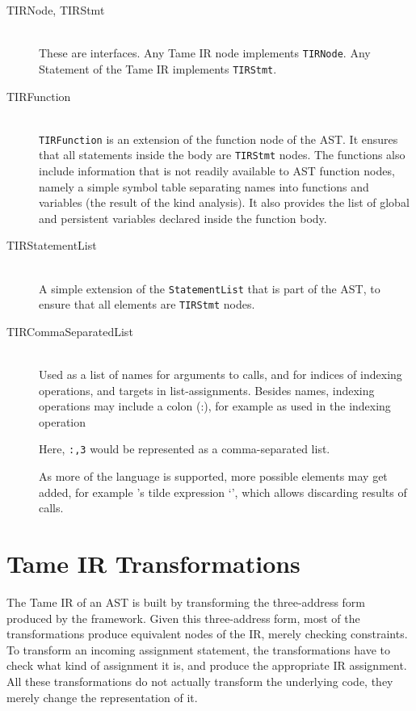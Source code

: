 \begin{description}
\item[TIRNode, TIRStmt] \hfill \\
These are interfaces. Any Tame IR node implements {\tt TIRNode}.
Any Statement of the Tame IR implements {\tt TIRStmt}.

\item[TIRFunction] \hfill \\
{\tt TIRFunction} is an extension of the function node of the AST.  It
ensures that all statements inside the body are {\tt TIRStmt} nodes.
The functions also include information that is not readily available to AST
function nodes, namely a simple symbol table separating names into
functions and variables (the result of the kind analysis).  It also
provides the list of global and persistent variables declared inside
the function body.

\item[TIRStatementList] \hfill \\
A simple extension of the {\tt StatementList} that is part of the AST,
to ensure that all elements are {\tt TIRStmt} nodes.

\item[TIRCommaSeparatedList] \hfill \\
Used as a list of names for arguments to calls, and for indices of
indexing operations, and targets in list-assignments. Besides names,
indexing operations may include a colon (:), for example as used in
the indexing operation

Here, {\tt :,3} would be represented as a comma-separated list.

As more of the \matlab language is supported, more possible elements
may get added, for example \matlab's tilde expression `\texttildelow', which allows
discarding results of calls.


\end{description}

\section{Tame IR Transformations}

The Tame IR of an AST is built by transforming the three-address form
produced by the \mcsaf framework. Given this three-address form, most
of the transformations produce equivalent nodes of the IR, merely checking
constraints. To transform an incoming assignment statement,
the transformations have to check what kind of assignment it is,
and produce the appropriate IR assignment. All these transformations
do not actually transform the underlying \matlab code, they merely
change the representation of it.

